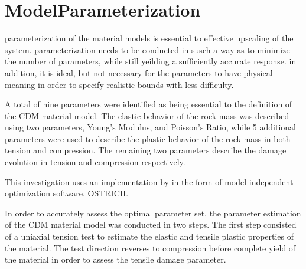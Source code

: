 \section{ModelParameterization}
parameterization of the material models is essential to effective upscaling of the system. parameterization needs to be conducted in susch a way as to minimize the number of parameters, while still yeilding a sufficiently accurate response. in addition, it is ideal, but not necessary for the parameters to have physical meaning in order to specify realistic bounds with less difficulty.

A total of nine parameters were identified as being essential to the definition of the CDM material model. The elastic behavior of the rock mass was described using two parameters, Young’s Modulus, and Poisson’s Ratio, while 5 additional parameters were used to describe the plastic behavior of the rock mass in both tension and compression. The remaining two parameters describe the damage evolution in tension and compression respectively.

This investigation uses an implementation by \citet{matott_ostrich:_2008} in the form of model-independent optimization software, OSTRICH.

In order to accurately assess the optimal parameter set, the parameter estimation of the CDM material model was conducted in two steps. The first step consisted of a uniaxial tension test to estimate the elastic and tensile plastic properties of the material. The test direction reverses to compression before complete yield of the material in order to assess the tensile damage parameter. 

